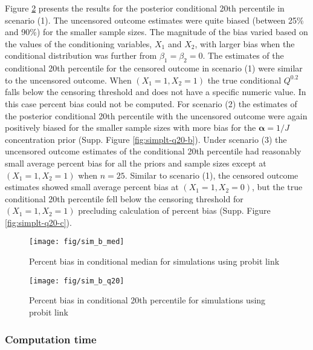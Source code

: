 \documentclass[
]{article}
\begin{document}
Figure \ref{fig:simplt-q20-a} presents the results for the posterior conditional 20th percentile in scenario (1). The uncensored outcome estimates were quite biased (between 25\% and 90\%) for the smaller sample sizes. The magnitude of the bias varied based on the values of the conditioning variables, \(X_1\) and \(X_2\), with larger bias when the conditional distribution was further from \(\beta_1 = \beta_2 = 0\). The estimates of the conditional 20th percentile for the censored outcome in scenario (1) were similar to the uncensored outcome. When \((X_1=1,X_2=1)\) the true conditional \(Q^{0.2}\) falls below the censoring threshold and does not have a specific numeric value. In this case percent bias could not be computed. For scenario (2) the estimates of the posterior conditional 20th percentile with the uncensored outcome were again positively biased for the smaller sample sizes with more bias for the \(\boldsymbol{\alpha}=1/J\) concentration prior (Supp. Figure \ref{fig:simplt-q20-b}). Under scenario (3) the uncensored outcome estimates of the conditional 20th percentile had reasonably small average percent bias for all the priors and sample sizes except at \((X_1=1,X_2=1)\) when \(n=25\). Similar to scenario (1), the censored outcome estimates showed small average percent bias at \((X_1=1,X_2=0)\), but the true conditional 20th percentile fell below the censoring threshold for \((X_1=1,X_2=1)\) precluding calculation of percent bias (Supp. Figure \ref{fig:simplt-q20-c}).

\begin{figure}

{\centering \texttt{[image: fig/sim\_b\_med]} 

}

\caption{Percent bias in conditional median for simulations using probit link}\label{fig:simplt-med-1}
\end{figure}

\begin{figure}

{\centering \texttt{[image: fig/sim\_b\_q20]} 

}

\caption{Percent bias in conditional 20th percentile for simulations using probit link}\label{fig:simplt-q20-a}
\end{figure}

\hypertarget{computation-time}{%
\subsubsection{Computation time}\label{computation-time}}
\end{document}
